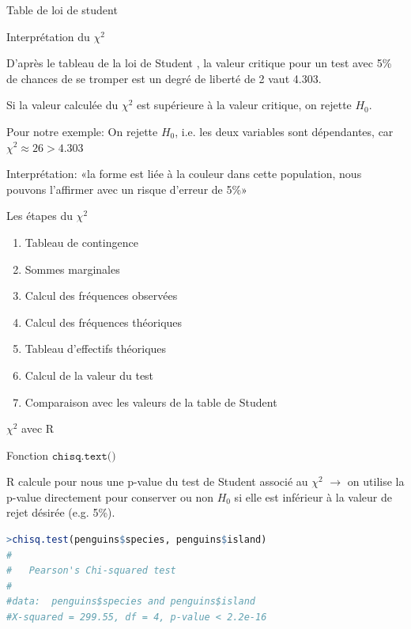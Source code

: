 \documentclass{beamer}
\begin{document}
\begin{frame}{Table de loi de student}



\end{frame}


\begin{frame}{Interprétation du $\chi^2$}


D'après le tableau de la loi de Student , la valeur critique pour un test avec 5\% de chances de se tromper est un degré de liberté de 2 vaut 4.303.

Si la valeur calculée du $\chi^2$ est \alert{supérieure} à la valeur critique, on \alert{rejette} $H_0$.



Pour notre exemple: On rejette $H_0$, i.e. les deux variables sont \alert{dépendantes},  car $\chi ^2 \approx 26 > 4.303$

Interprétation: «la forme est liée à la couleur dans cette population, nous pouvons l'affirmer avec un risque d'erreur de  5\%»

\end{frame}


\begin{frame}{Les étapes du $\chi ^2$}

\begin{enumerate}
\item Tableau de contingence
\item Sommes marginales 
\item Calcul des fréquences observées 
\item Calcul des fréquences théoriques
\item Tableau d'effectifs théoriques
\item Calcul de la valeur du test 
\item Comparaison avec les valeurs de la table de Student 
\end{enumerate}

\end{frame}


\begin{frame}[fragile]{$\chi ^2$ avec R }

Fonction  $\texttt{chisq.text()}$

R calcule pour nous une  p-value du test de Student associé au $\chi^2$ $\rightarrow$ on utilise la p-value directement pour conserver ou non $H_0$ si elle est inférieur à la valeur de rejet désirée (e.g. 5\%).

\vspace{0.6cm}

\begin{scriptsize}
\begin{spacing}{0.75}
\begin{lstlisting}[language=R,basicstyle=\footnotesize\ttfamily, commentstyle=\ttfamily]
>chisq.test(penguins$species, penguins$island)
#
#	Pearson's Chi-squared test
#
#data:  penguins$species and penguins$island
#X-squared = 299.55, df = 4, p-value < 2.2e-16
\end{lstlisting}
\end{spacing}
\end{scriptsize}
\end{frame}
\end{document}
